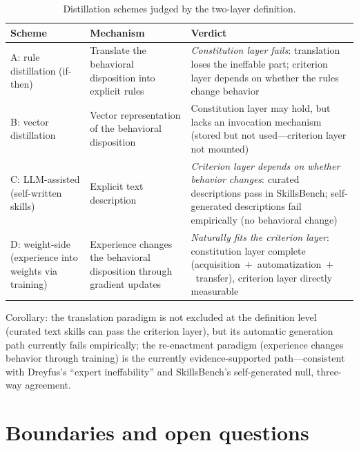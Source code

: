 \documentclass[11pt]{article}
\begin{document}
\begin{table}[h]
\centering
\begin{tabular}{@{}p{}p{}p{}@{}}
\toprule
Scheme & Mechanism & Verdict \\
\midrule
A: rule distillation (if-then) & Translate the behavioral disposition into explicit rules & \emph{Constitution layer fails}: translation loses the ineffable part; criterion layer depends on whether the rules change behavior \\
\addlinespace
B: vector distillation & Vector representation of the behavioral disposition & Constitution layer may hold, but lacks an invocation mechanism (stored but not used---criterion layer not mounted) \\
\addlinespace
C: LLM-assisted (self-written skills) & Explicit text description & \emph{Criterion layer depends on whether behavior changes}: curated descriptions pass in SkillsBench; self-generated descriptions fail empirically (no behavioral change) \cite{skillsbench} \\
\addlinespace
D: weight-side (experience into weights via training) & Experience changes the behavioral disposition through gradient updates & \emph{Naturally fits the criterion layer}: constitution layer complete (acquisition~$+$~automatization~$+$~transfer), criterion layer directly measurable \\
\bottomrule
\end{tabular}
\caption{Distillation schemes judged by the two-layer definition.}
\label{tab:schemes}
\end{table}

Corollary: the translation paradigm is not excluded at the definition level (curated text skills can pass the criterion layer), but its automatic generation path currently fails empirically; the re-enactment paradigm (experience changes behavior through training) is the currently evidence-supported path---consistent with Dreyfus's ``expert ineffability'' and SkillsBench's self-generated null, three-way agreement.

\section{Boundaries and open questions}
\label{sec:boundaries}
\end{document}
